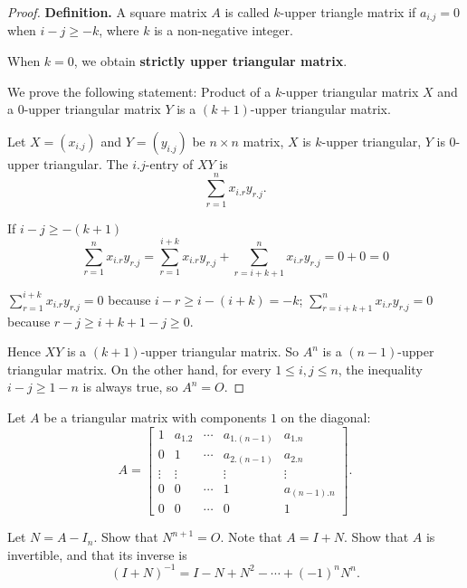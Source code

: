 \begin{proof}
    \textbf{Definition.} A square matrix $A$ is called $k$-upper triangle matrix if $a_{i.j} = 0$ when $i - j\ge -k$, where $k$ is a non-negative integer.

    When $k = 0$, we obtain \textbf{strictly upper triangular matrix}.

    We prove the following statement: Product of a $k$-upper triangular matrix $X$ and a $0$-upper triangular matrix $Y$ is a $(k+1)$-upper triangular matrix.

    Let $X = (x_{i.j})$ and $Y = (y_{i.j})$ be $n\times n$ matrix, $X$ is $k$-upper triangular, $Y$ is $0$-upper triangular. The $i.j$-entry of $XY$ is
    \[
        \sum^{n}_{r=1}x_{i.r}y_{r.j}.
    \]

    If $i - j\geq -(k + 1)$
    \[
        \sum^{n}_{r=1}x_{i.r}y_{r.j} = \sum^{i+k}_{r=1}x_{i.r}y_{r.j} + \sum^{n}_{r=i+k+1}x_{i.r}y_{r.j} = 0 + 0 = 0
    \]

    $\displaystyle\sum^{i+k}_{r=1}x_{i.r}y_{r.j} = 0$ because $i - r \geq i - (i + k) = -k$; $\displaystyle\sum^{n}_{r=i+k+1}x_{i.r}y_{r.j} = 0$ because $r - j \geq i + k + 1 - j \geq 0$.

    Hence $XY$ is a $(k+1)$-upper triangular matrix. So $A^{n}$ is a $(n-1)$-upper triangular matrix. On the other hand, for every $1\leq i, j\leq n$, the inequality $i - j \geq 1 - n$ is always true, so $A^{n} = O$.
\end{proof}

\begin{exercise}
    Let $A$ be a triangular matrix with components $1$ on the diagonal:
    \[
        A = \begin{bmatrix}
            1      & a_{1.2} & \cdots & a_{1.(n-1)} & a_{1.n}     \\
            0      & 1       & \cdots & a_{2.(n-1)} & a_{2.n}     \\
            \vdots & \vdots  &        & \vdots      & \vdots      \\
            0      & 0       & \cdots & 1           & a_{(n-1).n} \\
            0      & 0       & \cdots & 0           & 1
        \end{bmatrix}.
    \]

    Let $N = A - I_{n}$. Show that $N^{n+1} = O$. Note that $A = I + N$. Show that $A$ is invertible, and that its inverse is
    \[
        {(I + N)}^{-1} = I - N + N^{2} - \cdots + {(-1)}^{n}N^{n}.
    \]
\end{exercise}

